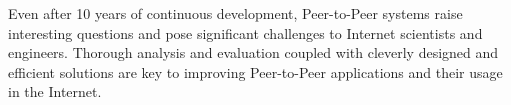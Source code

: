 Even after 10 years of continuous development, Peer-to-Peer systems raise
interesting questions and pose significant challenges to Internet scientists
and engineers. Thorough analysis and evaluation coupled with cleverly
designed and efficient solutions are key to improving Peer-to-Peer
applications and their usage in the Internet.
